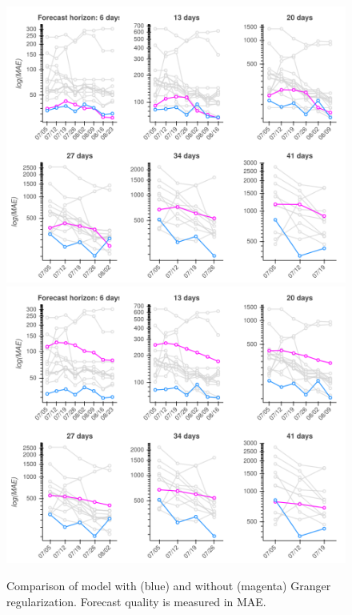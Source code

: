 \begin{figure}[t]
\centering
\includegraphics[width=.9\columnwidth]{img/us_mae_granger_ablation/us_mae_granger_ablation.png}
\hfil
\includegraphics[width=.9\columnwidth]{img/us_mae_loss_ablation/us_mae_granger_ablation.png}
\caption{\label{fig:mae-covidhub-granger}Comparison of \bAR model with (blue) and without (magenta) Granger regularization. Forecast quality is measured in MAE.}
\end{figure}



